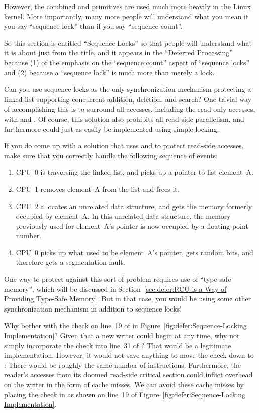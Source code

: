 	However, the combined  and
	 primitives are used much more heavily
	in the Linux kernel.
	More importantly, many more people will understand what you
	mean if you say ``sequence lock'' than if you say
	``sequence count''.

	So this section is entitled ``Sequence Locks'' so that people
	will understand what it is about just from the title, and
	it appears in the ``Deferred Processing'' because (1) of the
	emphasis on the ``sequence count'' aspect of ``sequence locks''
	and (2) because a ``sequence lock'' is much more than merely
	a lock.

\QuickQ{}
	Can you use sequence locks as the only synchronization
	mechanism protecting a linked list supporting concurrent
	addition, deletion, and search?
\QuickA{}
	One trivial way of accomplishing this is to surround all
	accesses, including the read-only accesses, with
	 and .
	Of course, this solution also prohibits all read-side
	parallelism, and furthermore could just as easily be implemented
	using simple locking.

	If you do come up with a solution that uses 
	and  to protect read-side accesses, make
	sure that you correctly handle the following sequence of events:

	\begin{enumerate}
	\item	CPU~0 is traversing the linked list, and picks up a pointer
		to list element~A.
	\item	CPU~1 removes element~A from the list and frees it.
	\item	CPU~2 allocates an unrelated data structure, and gets
		the memory formerly occupied by element~A.
		In this unrelated data structure, the memory previously
		used for element~A's  pointer is now occupied
		by a floating-point number.
	\item	CPU~0 picks up what used to be element~A's 
		pointer, gets random bits, and therefore gets a
		segmentation fault.
	\end{enumerate}

	One way to protect against this sort of problem requires use
	of ``type-safe memory'', which will be discussed in
	Section~\ref{sec:defer:RCU is a Way of Providing Type-Safe Memory}.
	But in that case, you would be using some other synchronization
	mechanism in addition to sequence locks!

\QuickQ{}
	Why bother with the check on line~19 of
	 in
	Figure~\ref{fig:defer:Sequence-Locking Implementation}?
	Given that a new writer could begin at any time, why not
	simply incorporate the check into line~31 of
	?
\QuickA{}
	That would be a legitimate implementation.
	However, it would not save anything to move the check down
	to : There would be roughly the same number
	of instructions.
	Furthermore, the reader's accesses from its doomed read-side
	critical section could inflict overhead on the writer in
	the form of cache misses.
	We can avoid these cache misses by placing the check in
	 as shown on line~19 of
	Figure~\ref{fig:defer:Sequence-Locking Implementation}.


